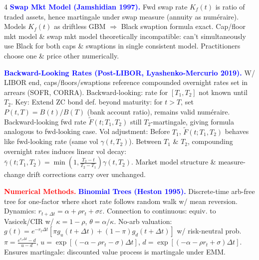 \documentclass[landscape]{article}
\begin{document}
\begin{multicols}{4}
\textcolor{blue}{\textbf{Swap Mkt Model (Jamshidian 1997).}} Fwd swap rate $K_f(t)$ is ratio of traded assets, hence martingale under swap measure (annuity as numéraire). Models $K_f(t)$ as driftless GBM $\Rightarrow$ Black swaption formula exact. Cap/floor mkt model \& swap mkt model theoretically incompatible: can't simultaneously use Black for both caps \& swaptions in single consistent model. Practitioners choose one \& price other numerically.

\textcolor{blue}{\textbf{Backward-Looking Rates (Post-LIBOR, Lyashenko-Mercurio 2019).}} W/ LIBOR end, caps/floors/swaptions reference compounded overnight rates set in arrears (SOFR, CORRA). Backward-looking: rate for $[T_1,T_2]$ not known until $T_2$. Key: Extend ZC bond def. beyond maturity: for $t>T$, set $P(t,T)=B(t)/B(T)$ (bank account ratio), remains valid numéraire. Backward-looking fwd rate $\tilde{F}(t;T_1,T_2)$ still $T_2$-martingale, giving formula analogous to fwd-looking case. Vol adjustment: Before $T_1$, $\tilde{F}(t;T_1,T_2)$ behaves like fwd-looking rate (same vol $\gamma(t,T_2)$). Between $T_1$ \& $T_2$, compounding overnight rates induces linear vol decay: $\bar{\gamma}(t;T_1,T_2)=\min(1,\frac{T_2-t}{T_2-T_1})\gamma(t,T_2)$. Market model structure \& measure-change drift corrections carry over unchanged.

\textcolor{red}{\textbf{Numerical Methods.}}
\textcolor{blue}{\textbf{Binomial Trees (Heston 1995).}} Discrete-time arb-free tree for one-factor where short rate follows random walk w/ mean reversion. Dynamics: $r_{t+\Delta t}=\alpha+\rho r_t+\sigma\varepsilon$. Connection to continuous: equiv. to Vasicek/CIR w/ $\kappa=1-\rho$, $\theta=\alpha/\kappa$. No-arb valuation: $g(t)=e^{-r_t\Delta t}[\pi g_u(t+\Delta t)+(1-\pi)g_d(t+\Delta t)]$ w/ risk-neutral prob. $\pi=\frac{e^{r_t\Delta t}-d}{u-d}$, $u=\exp[(-\alpha-\rho r_t-\sigma)\Delta t]$, $d=\exp[(-\alpha-\rho r_t+\sigma)\Delta t]$. Ensures martingale: discounted value process is martingale under EMM.


\end{multicols}
\end{document}
